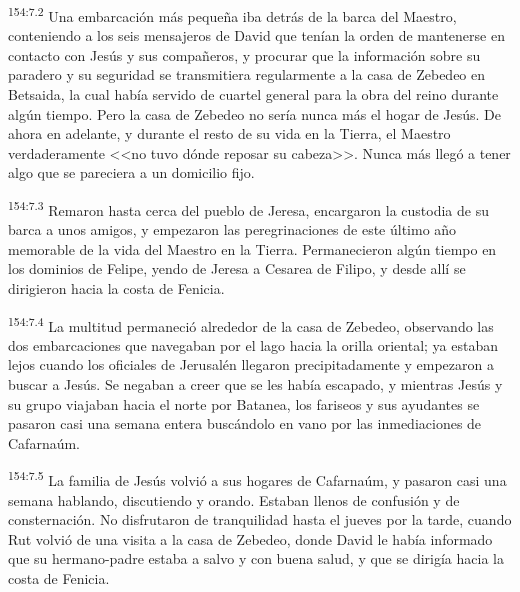 \par 
\textsuperscript{154:7.2} Una embarcación más pequeña iba detrás de la barca del Maestro, conteniendo a los seis mensajeros de David que tenían la orden de mantenerse en contacto con Jesús y sus compañeros, y procurar que la información sobre su paradero y su seguridad se transmitiera regularmente a la casa de Zebedeo en Betsaida, la cual había servido de cuartel general para la obra del reino durante algún tiempo. Pero la casa de Zebedeo no sería nunca más el hogar de Jesús. De ahora en adelante, y durante el resto de su vida en la Tierra, el Maestro verdaderamente <<no tuvo dónde reposar su cabeza>>. Nunca más llegó a tener algo que se pareciera a un domicilio fijo.

\par 
\textsuperscript{154:7.3} Remaron hasta cerca del pueblo de Jeresa, encargaron la custodia de su barca a unos amigos, y empezaron las peregrinaciones de este último año memorable de la vida del Maestro en la Tierra. Permanecieron algún tiempo en los dominios de Felipe, yendo de Jeresa a Cesarea de Filipo, y desde allí se dirigieron hacia la costa de Fenicia.

\par 
\textsuperscript{154:7.4} La multitud permaneció alrededor de la casa de Zebedeo, observando las dos embarcaciones que navegaban por el lago hacia la orilla oriental; ya estaban lejos cuando los oficiales de Jerusalén llegaron precipitadamente y empezaron a buscar a Jesús. Se negaban a creer que se les había escapado, y mientras Jesús y su grupo viajaban hacia el norte por Batanea, los fariseos y sus ayudantes se pasaron casi una semana entera buscándolo en vano por las inmediaciones de Cafarnaúm.

\par 
\textsuperscript{154:7.5} La familia de Jesús volvió a sus hogares de Cafarnaúm, y pasaron casi una semana hablando, discutiendo y orando. Estaban llenos de confusión y de consternación. No disfrutaron de tranquilidad hasta el jueves por la tarde, cuando Rut volvió de una visita a la casa de Zebedeo, donde David le había informado que su hermano-padre estaba a salvo y con buena salud, y que se dirigía hacia la costa de Fenicia.